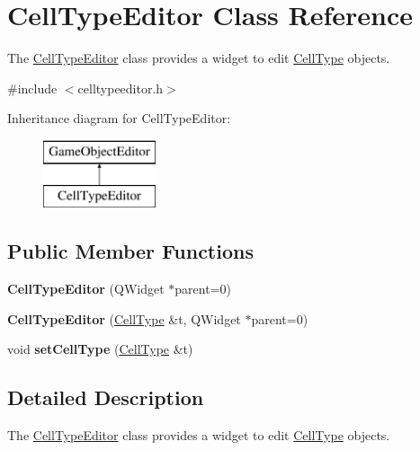 \hypertarget{class_cell_type_editor}{\section{\-Cell\-Type\-Editor \-Class \-Reference}
\label{class_cell_type_editor}
}


\-The \hyperlink{class_cell_type_editor}{\-Cell\-Type\-Editor} class provides a widget to edit \hyperlink{class_cell_type}{\-Cell\-Type} objects.  




{\ttfamily \#include $<$celltypeeditor.\-h$>$}

\-Inheritance diagram for \-Cell\-Type\-Editor\-:\begin{figure}[H]
\begin{center}
\leavevmode
\includegraphics[height=2.000000cm]{class_cell_type_editor}
\end{center}
\end{figure}
\subsection*{\-Public \-Member \-Functions}
\begin{DoxyCompactItemize}
\item 
\hypertarget{class_cell_type_editor_a73f1450158ae7ab6db0a030d8ea7602e}{{\bfseries \-Cell\-Type\-Editor} (\-Q\-Widget $\ast$parent=0)}\label{class_cell_type_editor_a73f1450158ae7ab6db0a030d8ea7602e}

\item 
\hypertarget{class_cell_type_editor_ad09d963fe2d4c39f63385666d57dad1f}{{\bfseries \-Cell\-Type\-Editor} (\hyperlink{class_cell_type}{\-Cell\-Type} \&t, \-Q\-Widget $\ast$parent=0)}\label{class_cell_type_editor_ad09d963fe2d4c39f63385666d57dad1f}

\item 
\hypertarget{class_cell_type_editor_a3c3180467fb7ddf289cda04c7c9fc85a}{void {\bfseries set\-Cell\-Type} (\hyperlink{class_cell_type}{\-Cell\-Type} \&t)}\label{class_cell_type_editor_a3c3180467fb7ddf289cda04c7c9fc85a}

\end{DoxyCompactItemize}


\subsection{\-Detailed \-Description}
\-The \hyperlink{class_cell_type_editor}{\-Cell\-Type\-Editor} class provides a widget to edit \hyperlink{class_cell_type}{\-Cell\-Type} objects. 

